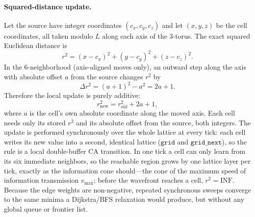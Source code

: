 \documentclass{ijuc}
\begin{document}
\paragraph{Squared-distance update.}
Let the source have integer coordinates $(c_{x},c_{y},c_{z})$ and let $(x,y,z)$ be the cell coordinates, all taken modulo $L$ along each axis of the 3-torus.  The exact squared Euclidean distance is
\[
r^{2}=(x-c_{x})^{2}+(y-c_{y})^{2}+(z-c_{z})^{2}.
\]
In the 6-neighborhood (axis-aligned moves only), an outward step along the axis with absolute offset $a$ from the source changes $r^{2}$ by
\[
\Delta r^{2}=(a+1)^{2}-a^{2}=2a+1.
\]
Therefore the local update is purely additive:
\[
r^{2}_{\text{new}}=r^{2}_{\text{old}}+2a+1,
\]
where $a$ is the cell's own absolute coordinate along the moved axis.  Each cell needs only its stored $r^{2}$ and its absolute offset from the source, both integers.  The update is performed synchronously over the whole lattice at every tick: each cell writes its new value into a second, identical lattice ($\texttt{grid}$ and $\texttt{grid\_next}$), so the rule is a local double-buffer CA transition.  In one tick a cell can only learn from its six immediate neighbors, so the reachable region grows by one lattice layer per tick, exactly as the information cone should---the cone of the maximum speed of information transmission $v_{\max}$; before the wavefront reaches a cell, $r^{2}=\mathrm{INF}$.  Because the edge weights are non-negative, repeated synchronous sweeps converge to the same minima a Dijkstra/BFS relaxation would produce, but without any global queue or frontier list.
\end{document}
